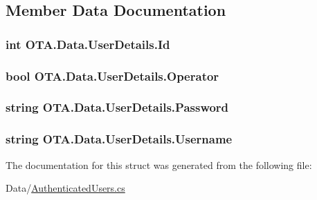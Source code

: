 \subsection{Member Data Documentation}
\hypertarget{struct_o_t_a_1_1_data_1_1_user_details_ab9a16f1c53cfd9d6178cb85d2019c996}{}
\subsubsection[{Id}]{\setlength{\rightskip}{0pt plus 5cm}int O\+T\+A.\+Data.\+User\+Details.\+Id}\label{struct_o_t_a_1_1_data_1_1_user_details_ab9a16f1c53cfd9d6178cb85d2019c996}
\hypertarget{struct_o_t_a_1_1_data_1_1_user_details_a1bb854f82be38db8087a9a0158649899}{}
\subsubsection[{Operator}]{\setlength{\rightskip}{0pt plus 5cm}bool O\+T\+A.\+Data.\+User\+Details.\+Operator}\label{struct_o_t_a_1_1_data_1_1_user_details_a1bb854f82be38db8087a9a0158649899}
\hypertarget{struct_o_t_a_1_1_data_1_1_user_details_a34906dbcc3153205ee426046c122e8c0}{}
\subsubsection[{Password}]{\setlength{\rightskip}{0pt plus 5cm}string O\+T\+A.\+Data.\+User\+Details.\+Password}\label{struct_o_t_a_1_1_data_1_1_user_details_a34906dbcc3153205ee426046c122e8c0}
\hypertarget{struct_o_t_a_1_1_data_1_1_user_details_a602319917fd4027ab5769084e9008ab0}{}
\subsubsection[{Username}]{\setlength{\rightskip}{0pt plus 5cm}string O\+T\+A.\+Data.\+User\+Details.\+Username}\label{struct_o_t_a_1_1_data_1_1_user_details_a602319917fd4027ab5769084e9008ab0}


The documentation for this struct was generated from the following file\+:\begin{DoxyCompactItemize}
\item 
Data/\hyperlink{_authenticated_users_8cs}{Authenticated\+Users.\+cs}\end{DoxyCompactItemize}
